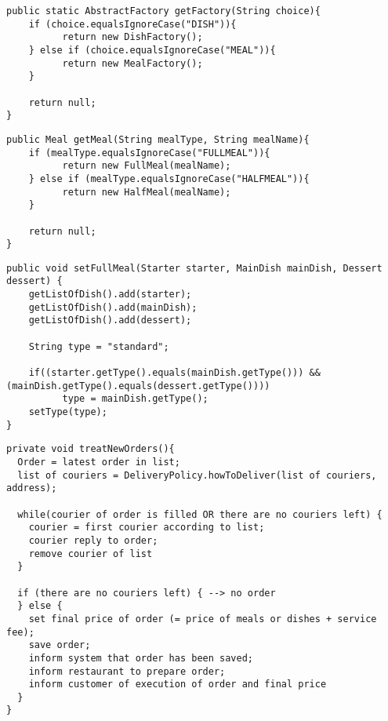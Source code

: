 
\begin{lstlisting}[caption=Factory producer for \texttt{Dish} and \texttt{Meal}.,
label=lst:createFactory]
public static AbstractFactory getFactory(String choice){
    if (choice.equalsIgnoreCase("DISH")){
    	  return new DishFactory();
    } else if (choice.equalsIgnoreCase("MEAL")){
    	  return new MealFactory();
    }
    
    return null;
}
\end{lstlisting}

\begin{lstlisting}[caption=\emph{MealFactory} to create \texttt{Meal}.,
label=lst:mealCreator]
public Meal getMeal(String mealType, String mealName){
    if (mealType.equalsIgnoreCase("FULLMEAL")){
    	  return new FullMeal(mealName);
    } else if (mealType.equalsIgnoreCase("HALFMEAL")){
    	  return new HalfMeal(mealName);
    } 
    
    return null;		
}
\end{lstlisting}

\begin{lstlisting}[caption=Set method to add \texttt{Dish} to \texttt{Meal}.,
label=lst:SetFullMeal]
public void setFullMeal(Starter starter, MainDish mainDish, Dessert dessert) {
    getListOfDish().add(starter);
    getListOfDish().add(mainDish);
    getListOfDish().add(dessert);
    
    String type = "standard";
    	
    if((starter.getType().equals(mainDish.getType())) && (mainDish.getType().equals(dessert.getType())))
    	  type = mainDish.getType();
    setType(type);
}
\end{lstlisting}


\begin{lstlisting}[caption=Pseudocode method to treat \texttt{Order} of \texttt{Core}.,
label=lst:treatOrder]
private void treatNewOrders(){ 
  Order = latest order in list;
  list of couriers = DeliveryPolicy.howToDeliver(list of couriers, address);
  	
  while(courier of order is filled OR there are no couriers left) { 
    courier = first courier according to list;
    courier reply to order;
    remove courier of list
  }
  
  if (there are no couriers left) { --> no order 
  } else {
    set final price of order (= price of meals or dishes + service fee);
    save order;
    inform system that order has been saved;
    inform restaurant to prepare order;
    inform customer of execution of order and final price 
  }
}
\end{lstlisting}

